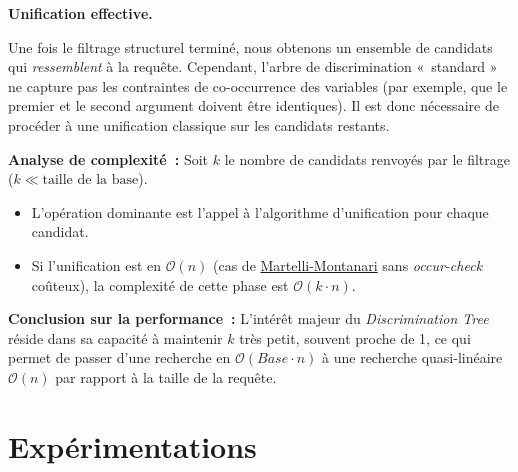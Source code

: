 \documentclass[11pt]{article}
\newenvironment{paraph}[1]{%
  \medskip
  \noindent\textbf{#1.}\quad

  \vspace{0.2cm}
}{%
  \medskip
}
\begin{document}
\begin{paraph}{Unification effective}
    Une fois le filtrage structurel terminé, nous obtenons un ensemble de 
    candidats qui \textit{ressemblent} à la requête. Cependant, l'arbre de 
    discrimination «~standard » ne capture pas les contraintes de co-occurrence 
    des variables (par exemple, que le premier et le second argument doivent 
    être identiques). Il est donc nécessaire de procéder à une unification 
    classique sur les candidats restants.

    \vspace{0.2cm}
    \textbf{Analyse de complexité~:}
    Soit $k$ le nombre de candidats renvoyés par le filtrage ($k \ll \text{taille de la base}$).
    \begin{itemize}
        \item L'opération dominante est l'appel à l'algorithme d'unification pour chaque candidat.
        \item Si l'unification est en $\mathcal{O}(n)$ (cas de \hyperref[sec:mm]{Martelli-Montanari} sans \textit{occur-check} coûteux), la complexité de cette phase est $\mathcal{O}(k \cdot n)$.
    \end{itemize}
    \textbf{Conclusion sur la performance~:} 
    L'intérêt majeur du \textit{Discrimination Tree} réside dans sa capacité 
    à maintenir $k$ très petit, souvent proche de 1, ce qui permet de passer 
    d'une recherche en $\mathcal{O}(Base \cdot n)$ à une recherche quasi-linéaire 
    $\mathcal{O}(n)$ par rapport à la taille de la requête.
\end{paraph}

\newpage

\section{Expérimentations}
\end{document}
